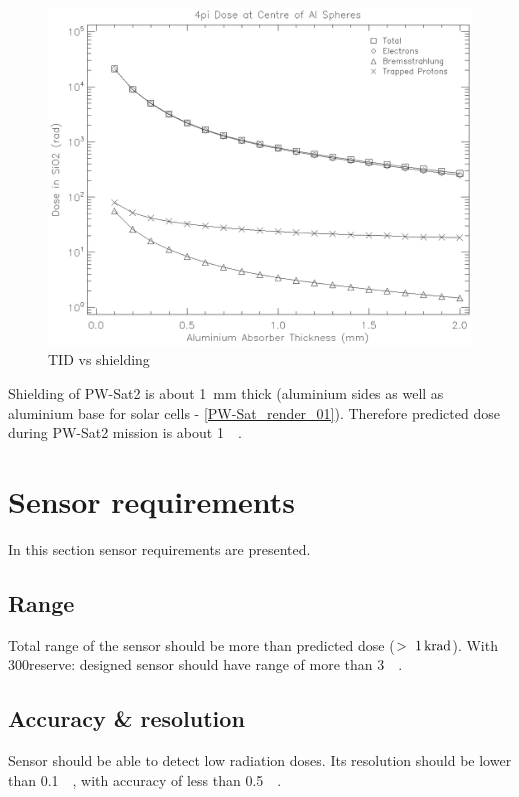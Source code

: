 	\begin{figure}[H]
		\centering
		\includegraphics[width=0.7\paperwidth]{img/dose.eps}
		\caption{TID vs shielding}
		\label{TIDvsSheilding}
	\end{figure}

	Shielding of PW-Sat2 is about \SI{1}{\milli\meter} thick (aluminium sides as well as aluminium base for solar cells - \ref{PW-Sat_render_01}). Therefore predicted dose during PW-Sat2 mission is about \SI{1}{\kilo\rad}.




\section{Sensor requirements}
	In this section sensor requirements are presented.

\subsection{Range}
	Total range of the sensor should be more than predicted dose ($>~\SI{1}{\kilo\radian}$). With 300\percent reserve: designed sensor should have range of more than \SI{3}{\kilo\rad}.
	
\subsection{Accuracy \& resolution}
	Sensor should be able to detect low radiation doses. Its resolution should be lower than \SI{0.1}{\kilo\rad}, with accuracy of less than \SI{0.5}{\kilo\rad}.




